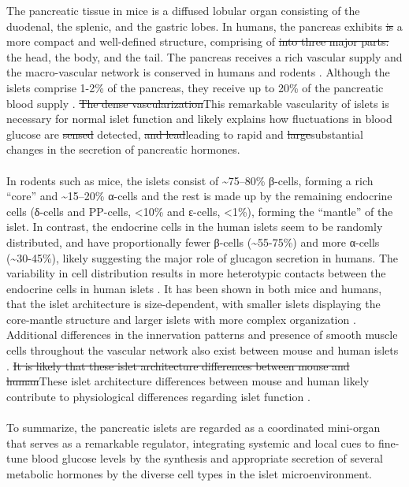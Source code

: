 The pancreatic tissue in mice is a diffused lobular organ consisting of the duodenal, the splenic, and the gastric lobes. In humans, the pancreas exhibits \st{is} a more compact and well-defined structure, comprising of \st{into three major parts:} the head, the body, and the tail. The pancreas receives a rich vascular supply and the macro-vascular network is conserved in humans and rodents \textbf{\cite{muratore_vascular_2021}}. Although the islets comprise 1-2\% of the pancreas, they receive up to 20\% of the pancreatic blood supply \textbf{\cite{muratore_vascular_2021,jansson_glucose-induced_1986}}. \st{The dense vascularization}This remarkable vascularity of islets is necessary for normal islet function and likely explains how fluctuations in blood glucose are \st{sensed} detected, \st{and lead}leading to rapid and \st{large}substantial changes in the secretion of pancreatic hormones.
\\\\
In rodents such as mice, the islets consist of \textasciitilde75–80\% β-cells, forming a rich “core” and \textasciitilde15–20\% α-cells and the rest is made up by the remaining endocrine cells (δ-cells and PP-cells, <10\% and ε-cells, <1\%), forming the “mantle” of the islet. In contrast, the endocrine cells in the human islets seem to be randomly distributed, and have proportionally fewer β-cells (\textasciitilde55-75\%) and more α-cells (\textasciitilde30-45\%), likely suggesting the major role of glucagon secretion in humans. The variability in cell distribution results in more heterotypic contacts between the endocrine cells in human islets \textbf{\cite{walker_human_2021}}. It has been shown in both mice and humans, that the islet architecture is size-dependent, with smaller islets displaying the core-mantle structure and larger islets with more complex organization \textbf{\cite{dolensek_structural_2015}}. Additional differences in the innervation patterns and presence of smooth muscle cells throughout the vascular network also exist between mouse and human islets \textbf{\cite{rodriguez-diaz_autonomic_2011}}. \st{It is likely that these islet architecture differences between mouse and human}These islet architecture differences between mouse and human likely contribute to physiological differences regarding islet function \textbf{\cite{cabrera_unique_2006}}.
\\\\
To summarize, the pancreatic islets are regarded as a coordinated mini-organ that serves as a remarkable regulator, integrating systemic and local cues to fine-tune blood glucose levels by the synthesis and appropriate secretion of several metabolic hormones by the diverse cell types in the islet microenvironment.



